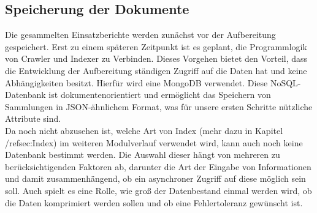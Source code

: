 \subsection{Speicherung der Dokumente}
\label{sec:Speicherung}
Die gesammelten Einsatzberichte werden zunächst vor der Aufbereitung gespeichert. Erst zu einem späteren Zeitpunkt ist es geplant, die Programmlogik von Crawler und Indexer zu Verbinden. Dieses Vorgehen bietet den Vorteil, dass die Entwicklung der Aufbereitung ständigen Zugriff auf die Daten hat und keine Abhängigkeiten besitzt. Hierfür wird eine MongoDB verwendet. Diese NoSQL-Datenbank ist dokumentenorientiert und ermöglicht das Speichern von Sammlungen in JSON-ähnlichem Format, was für unsere ersten Schritte nützliche Attribute sind.\\
Da noch nicht abzusehen ist, welche Art von Index (mehr dazu in Kapitel /ref{sec:Index}) im weiteren Modulverlauf verwendet wird, kann auch noch keine Datenbank bestimmt werden. Die Auswahl dieser hängt von mehreren zu berücksichtigenden Faktoren ab, darunter die Art der Eingabe von Informationen und damit zusammenhängend, ob ein asynchroner Zugriff auf diese möglich sein soll. Auch spielt es eine Rolle, wie groß der Datenbestand einmal werden wird, ob die Daten komprimiert werden sollen und ob eine Fehlertoleranz gewünscht ist. \cite{wikimongodb}

